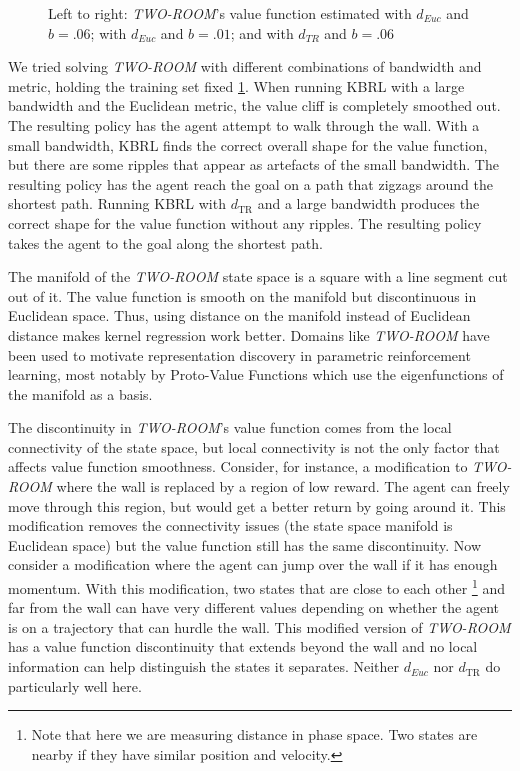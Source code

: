 \documentclass{article} %
\begin{document}
\begin{figure}[!htb]
  \endminipage\hfill
\caption[Importance of Representation]
{Left to right: \textit{TWO-ROOM}'s
 value function estimated with $d_{Euc}$ and $b=.06$; with $d_{Euc}$ and
$b=.01$; and with $d_{TR}$ and $b=.06$}
\label{trgraphs}
\end{figure}

We tried solving \textit{TWO-ROOM} with different combinations of bandwidth and metric,
holding the training set fixed \ref{trgraphs}.
When running KBRL with a large bandwidth and the Euclidean metric,
the value cliff is completely smoothed out.
The resulting policy has the agent attempt to walk through the wall.
With a small bandwidth, KBRL finds the correct overall shape for
the value function, but there are some ripples that appear as artefacts of
the small bandwidth.
The resulting policy has the agent reach the goal on a path that zigzags 
around the shortest path.
Running KBRL with $d_{\mathrm{TR}}$ and a large bandwidth produces the
correct shape for the value function without any ripples.
The resulting policy takes the agent to the goal along the shortest path.

The manifold of the \textit{TWO-ROOM} state space is a square with
a line segment cut out of it.
The value function is smooth on the manifold but discontinuous in Euclidean space.
Thus, using distance on the manifold instead of Euclidean distance makes kernel
regression work better.
Domains like \textit{TWO-ROOM} have been used to motivate representation discovery in
parametric reinforcement learning, most notably by
Proto-Value Functions \cite{pvf} which use the eigenfunctions of the manifold as a basis.

The discontinuity in \textit{TWO-ROOM}'s value function comes from the local
connectivity of the state space, but local connectivity is not the only factor that affects
value function smoothness.
Consider, for instance, a modification to \textit{TWO-ROOM} where the wall is replaced
by a region of low reward.
The agent can freely move through this region, but would get a better return
by going around it.
This modification removes the connectivity issues (the state space manifold is
Euclidean space) but the value function still has the same discontinuity.
Now consider a modification where the agent can jump over the wall if it has
enough momentum. With this modification, two states that are close to each other
\footnote{Note that here we are measuring distance in phase space. Two states are nearby if
they have similar position and velocity.}
and far from the wall can have very different values depending on whether the agent
is on a trajectory that can hurdle the wall.
This modified version of \textit{TWO-ROOM} has a value function discontinuity that extends
beyond the wall and no local information can help distinguish the states it separates.
Neither $d_{Euc}$ nor $d_{\mathrm{TR}}$ do particularly well here.
\end{document}
